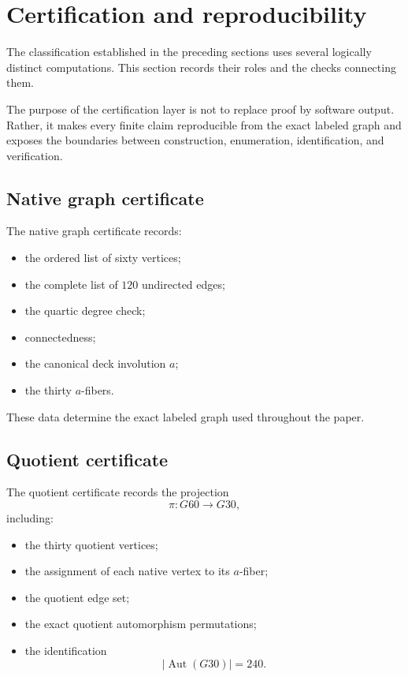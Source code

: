 \section{Certification and reproducibility}
\label{sec:certification}

The classification established in the preceding sections uses several
logically distinct computations. This section records their roles and
the checks connecting them.

The purpose of the certification layer is not to replace proof by
software output. Rather, it makes every finite claim reproducible from
the exact labeled graph and exposes the boundaries between construction,
enumeration, identification, and verification.

\subsection{Native graph certificate}

The native graph certificate records:

\begin{itemize}
\item the ordered list of sixty vertices;
\item the complete list of $120$ undirected edges;
\item the quartic degree check;
\item connectedness;
\item the canonical deck involution $a$;
\item the thirty $a$-fibers.
\end{itemize}

These data determine the exact labeled graph used throughout the paper.

\subsection{Quotient certificate}

The quotient certificate records the projection
\[
\pi\colon G60\longrightarrow G30,
\]
including:

\begin{itemize}
\item the thirty quotient vertices;
\item the assignment of each native vertex to its $a$-fiber;
\item the quotient edge set;
\item the exact quotient automorphism permutations;
\item the identification
\[
|\operatorname{Aut}(G30)|=240.
\]
\end{itemize}

